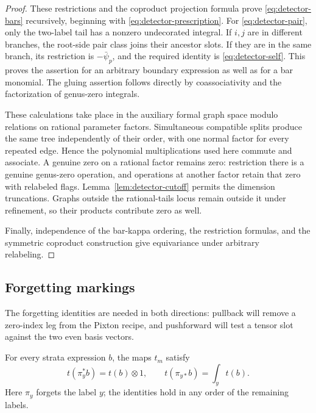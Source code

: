 \begin{proof}
These restrictions and the coproduct projection formula prove
\eqref{eq:detector-bars} recursively, beginning with \eqref{eq:detector-prescription}.
For \eqref{eq:detector-pair}, only the two-label tail has a
nonzero undecorated integral.  If \(i,j\) are in different
branches, the root-side pair class joins their ancestor slots.
If they are in the same branch, its restriction is
\(-\bar\psi_p\), and the required identity is
\eqref{eq:detector-self}.  This proves the assertion for an
arbitrary boundary expression as well as for a bar monomial.
The gluing assertion follows directly by coassociativity and
the factorization of genus-zero integrals.

These calculations take place in the auxiliary formal graph space
modulo relations on rational parameter factors.  Simultaneous
compatible splits produce the same tree independently of their
order, with one normal factor for every repeated edge.  Hence the
polynomial multiplications used here commute and associate.
A genuine zero on a rational factor remains zero: restriction
there is a genuine genus-zero operation, and operations at another
factor retain that zero with relabeled flags.
Lemma~\ref{lem:detector-cutoff} permits the dimension truncations.
Graphs outside the rational-tails locus remain outside it under
refinement, so their products contribute zero as well.

Finally, independence of the bar-kappa ordering, the restriction
formulas, and the symmetric coproduct construction give
equivariance under arbitrary relabeling.
\end{proof}

\subsection{Forgetting markings}

The forgetting identities are needed in both directions: pullback
will remove a zero-index leg from the Pixton recipe, and pushforward
will test a tensor slot against the two even basis vectors.

\begin{lemma}
\label{lem:detector-forgetting}
For every strata expression \(b\), the maps \(t_m\) satisfy
\begin{equation}
 t(\pi_y^*b)=t(b)\otimes1,
 \qquad
 t(\pi_{y*}b)=\int_y t(b).
 \label{eq:detector-forget}
\end{equation}
Here \(\pi_y\) forgets the label \(y\); the identities hold
in any order of the remaining labels.
\end{lemma}

